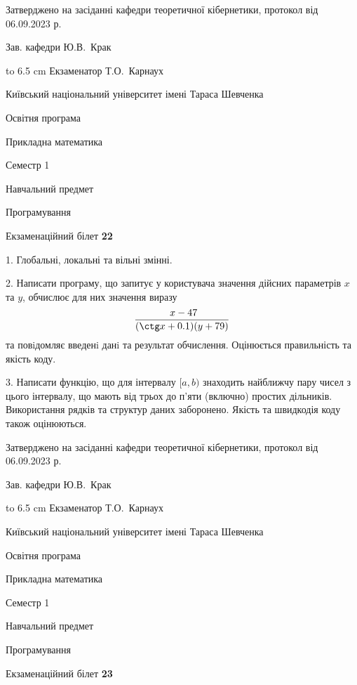 \documentclass[12pt, ukrainian]{article}
\begin{document}
{\smallskip\smallskip \begin {scriptsize} Затверджено на засіданні кафедри теоретичної кібернетики, протокол   від   06.09.2023 р.\par\smallskip\smallskip\smallskip\smallskip
{\parbox {6.5 cm} {Зав. кафедри \dotfill Ю.В.~Крак}}\hspace {0.7cm} {\hbox to 6.5 cm { Екзаменатор \dotfill Т.О.~Карнаух}} \end{scriptsize}}
\newpage
{{\begin {scriptsize}\par
{ \center  Київський національний університет імені Тараса Шевченка \par}
{\parbox {5 cm}{Освітня програма \hfill}{\parbox {7 cm}{Прикладна математика\hfill}}\parbox {6 cm}{\hfill Семестр 1}}\par
{\parbox {5 cm} {Навчальний предмет \hfill}\parbox {7 cm}{Програмування \hfill}\parbox {6cm}{\hfill}\par}\vspace{-15pt} \end{scriptsize}}{\center Екзаменаційний білет \No \textbf { 22 }\par}}
{%
1. Глобальні, локальні та вільні змінні.%
\par
2. Написати програму, що запитує у користувача значення дійсних параметрів $x$ та $y$, обчислює для них значення виразу 
$$\frac{\ x - 47}{(\ctg x + 0.1) (y + 79)}$$ 
та повiдомляє введенi данi та результат обчислення.
 Оцінюється правильність та якість коду.

\par
3. Написати функцію, що для інтервалу $[a, b)$ знаходить найближчу пару чисел з цього інтервалу, що мають від трьох до п'яти (включно) простих дільників.  Використання рядків та структур даних заборонено. Якість та швидкодія коду також оцінюються. 

}
{\smallskip\smallskip \begin {scriptsize} Затверджено на засіданні кафедри теоретичної кібернетики, протокол   від   06.09.2023 р.\par\smallskip\smallskip\smallskip\smallskip
{\parbox {6.5 cm} {Зав. кафедри \dotfill Ю.В.~Крак}}\hspace {0.7cm} {\hbox to 6.5 cm { Екзаменатор \dotfill Т.О.~Карнаух}} \end{scriptsize}}
\vspace{0.9cm}
{{\begin {scriptsize}\par
{ \center  Київський національний університет імені Тараса Шевченка \par}
{\parbox {5 cm}{Освітня програма \hfill}{\parbox {7 cm}{Прикладна математика\hfill}}\parbox {6 cm}{\hfill Семестр 1}}\par
{\parbox {5 cm} {Навчальний предмет \hfill}\parbox {7 cm}{Програмування \hfill}\parbox {6cm}{\hfill}\par}\vspace{-15pt} \end{scriptsize}}{\center Екзаменаційний білет \No \textbf { 23 }\par}}
\end{document}
